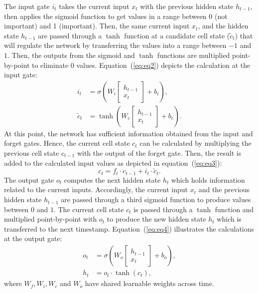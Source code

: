 The input gate \(i_{t}\) takes the current input \(x_t\) with the previous hidden state \(h_{t-1}\), then applies the sigmoid function to get values in a range between 0 (not important) and 1 (important).
Then, the same current input \(x_t\), and the hidden state \(h_{t-1}\) are passed through a \(\tanh\) function at a candidate cell state (\(\tilde{c}_{t}\)) that will regulate the network by transferring the values into a range between \(-1\) and \(1\).
Then, the outputs from the sigmoid and \(\tanh\) functions are multiplied point-by-point to eliminate \(0\) values.  
Equation~(\ref{eq:eq2}) depicts the calculation at the input gate:
\begin{equation}
	\begin{aligned}
		i_{t} &=\sigma\left(W_{i} 
		\left[
		\begin{array}{c}
			h_{t-1} \\ x_{t}
		\end{array} 
		\right]+b_{i}\right), 
		\\
		\tilde{c}_{t} &=\tanh \left(W_{c} 
		\left[
		\begin{array}{c}
			h_{t-1} \\ x_{t}
		\end{array} 
		\right]+b_{c}\right). 
	\end{aligned} \label{eq:eq2}
\end{equation}
At this point, the network has sufficient information obtained from the input and forget gates. 
Hence, the current cell state \(c_{t}\) can be calculated by multiplying the previous cell state \(c_{t-1}\) with the output of the forget gate. 
Then, the result is added to the calculated input values as depicted in 
equation~(\ref{eq:eq3}):
\begin{equation}
	c_{t}=f_{t} \cdot c_{t-1}+i_{t} \cdot \tilde{c}_{t}.
	\label{eq:eq3}
\end{equation}
The output gate \(o_{t}\) computes the next hidden state \(h_{t}\) which
holds information related to the current inputs. 
Accordingly, the current input \(x_{t}\) and the previous hidden state \(h_{t-1}\) are passed through a third sigmoid function to produce values between \(0\) and \(1\).
The current cell state \(c_{t}\) is passed through a \(\tanh\) function and multiplied point-by-point with \(o_{t}\) to produce the new hidden state \(h_{t}\) which is transferred to the next timestamp.
Equation~(\ref{eq:eq4}) illustrates the calculations at the output gate:
\begin{equation}
	\begin{aligned}
		o_{t} &=\sigma\left(W_{o} 
		\left[
		\begin{array}{c}
			h_{t-1} \\ x_{t}
		\end{array} 
		\right]
		+b_{o}\right), \\
		h_{t} &=o_{t} \cdot \tanh \left(c_{t}\right),
	\end{aligned}
	\label{eq:eq4}
\end{equation} 
where \(W_{f}, W_{i}, W_{c}\) and \(W_{o}\) have shared learnable weights across time.

